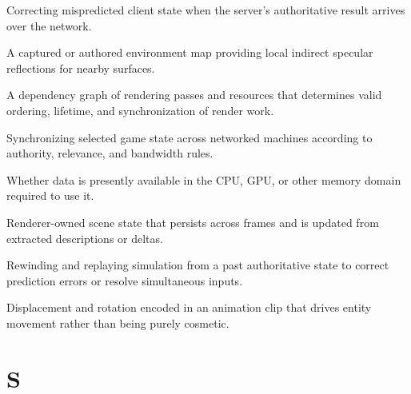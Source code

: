\documentclass[
  11pt,
  letterpaper,
  DIV=11,
  numbers=noendperiod,
  twoside,
  open=right]{scrreprt}
\providecommand{\tightlist}{%
  \setlength{\itemsep}{0pt}\setlength{\parskip}{0pt}}
\begin{document}
\begin{description}
\tightlist
\item[\textbf{Reconciliation}]
Correcting mispredicted client state when the server's authoritative
result arrives over the network.
\item[\textbf{Reflection probe}]
A captured or authored environment map providing local indirect specular
reflections for nearby surfaces.
\item[\textbf{Render graph}]
A dependency graph of rendering passes and resources that determines
valid ordering, lifetime, and synchronization of render work.
\item[\textbf{Replication}]
Synchronizing selected game state across networked machines according to
authority, relevance, and bandwidth rules.
\item[\textbf{Residency}]
Whether data is presently available in the CPU, GPU, or other memory
domain required to use it.
\item[\textbf{Retained render scene}]
Renderer-owned scene state that persists across frames and is updated
from extracted descriptions or deltas.
\item[\textbf{Rollback}]
Rewinding and replaying simulation from a past authoritative state to
correct prediction errors or resolve simultaneous inputs.
\item[\textbf{Root motion}]
Displacement and rotation encoded in an animation clip that drives
entity movement rather than being purely cosmetic.
\end{description}

\section*{S}\label{s}

\end{document}

